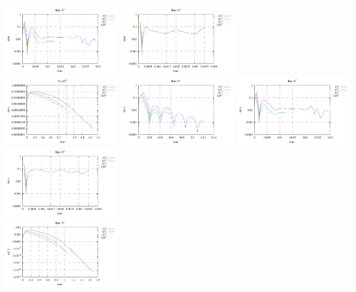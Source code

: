 \begin{center}
\includegraphics[width=4.297cm]{python_codes/fieldstone_155/results/conv_u_Ra1e5}
\includegraphics[width=4.297cm]{python_codes/fieldstone_155/results/conv_u_Ra1e6}\\
\includegraphics[width=4.297cm]{python_codes/fieldstone_155/results/conv_v_Ra1e3}
\includegraphics[width=4.297cm]{python_codes/fieldstone_155/results/conv_v_Ra1e4}
\includegraphics[width=4.297cm]{python_codes/fieldstone_155/results/conv_v_Ra1e5}
\includegraphics[width=4.297cm]{python_codes/fieldstone_155/results/conv_v_Ra1e6}\\
\includegraphics[width=4.297cm]{python_codes/fieldstone_155/results/conv_T_Ra1e3}

\end{center}

